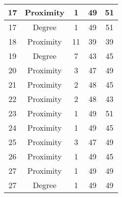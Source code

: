 \documentclass[results.tex]{subfiles}
\begin{document}
\begin{center}
\begin{tabular}{| c || c | c | c | c |}
            \hline
            17                      & Proximity                    & 1                      & 49                      & 51                   \\
            \hline
            17                      & Degree                       & 1                      & 49                      & 51                   \\
            \hline
            18                      & Proximity                    & 11                     & 39                      & 39                   \\
            \hline
            19                      & Degree                       & 7                      & 43                      & 45                   \\
            \hline
            20                      & Proximity                    & 3                      & 47                      & 49                   \\
            \hline
            21                      & Proximity                    & 2                      & 48                      & 45                   \\
            \hline
            22                      & Proximity                    & 2                      & 48                      & 43                   \\
            \hline
            23                      & Proximity                    & 1                      & 49                      & 51                   \\
            \hline
            24                      & Proximity                    & 1                      & 49                      & 45                   \\
            \hline
            25                      & Proximity                    & 3                      & 47                      & 49                   \\
            \hline
            26                      & Proximity                    & 1                      & 49                      & 45                   \\
            \hline
            27                      & Proximity                    & 1                      & 49                      & 49                   \\
            \hline
            27                      & Degree                       & 1                      & 49                      & 49                   \\

\end{tabular}
\end{center}
\end{document}
